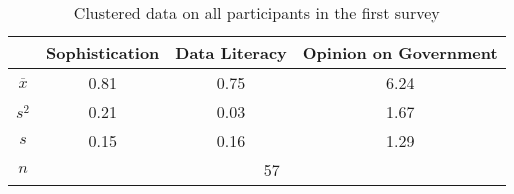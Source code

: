 \begin{small}
  \begin{table}[ht]
    \centering
    \renewcommand{\arraystretch}{0.7}
      \begin{tabular}{c c c c}
        \toprule
        &Sophistication&Data Literacy&Opinion on  Government\\
        \midrule
        $\overline{x}$&0.81&0.75&6.24\\
        $s^2$&0.21&0.03&1.67\\
        $s$&0.15&0.16&1.29\\
        $n$&\multicolumn{3}{c}{57}\\
        \bottomrule
      \end{tabular}
    \caption{Clustered data on all participants in the first survey}\label{tab:firstSurveyAllData}
  \end{table}
\end{small}